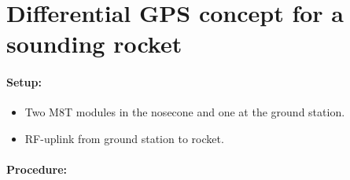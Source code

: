 \chapter{Differential GPS concept for a sounding rocket}

\subsubsection{Setup:}
\begin{itemize}
 \item Two M8T modules in the nosecone and one at the ground station.
 
 \item RF-uplink from ground station to rocket.
\end{itemize}


\subsubsection{Procedure:}

